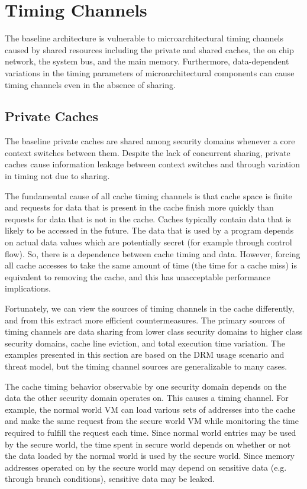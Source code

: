 \section{Timing Channels}
\label{sec:tc_sources}
The baseline architecture is vulnerable to microarchitectural timing channels 
caused by shared resources including the private and shared caches, the on chip 
network, the system bus, and the main memory. Furthermore, data-dependent 
variations in the timing parameters of microarchitectural components can cause 
timing channels even in the absence of sharing.

\subsection{Private Caches}
The baseline private caches are shared among security domains whenever a core 
context switches between them. Despite the lack of concurrent sharing, private 
caches cause information leakage between context switches and through variation 
in timing not due to sharing. 

The fundamental cause of all cache timing channels is that cache space is 
finite and requests for data that is present in the cache finish more quickly 
than requests for data that is not in the cache. Caches typically contain data 
that is likely to be accessed in the future. The data that is used by a program 
depends on actual data values which are potentially secret (for example through 
control flow). So, there is a dependence between cache timing and data.  
However, forcing all cache accesses to take the same amount of time (the time 
for a cache miss) is equivalent to removing the cache, and this has 
unacceptable performance implications.

Fortunately, we can view the sources of timing channels in the cache 
differently, and from this extract more efficient countermeasures. The primary 
sources of timing channels are data sharing from lower class security domains 
to higher class security domains, cache line eviction, and total execution time 
variation. The examples presented in this section are based on the DRM usage 
scenario and threat model, but the timing channel sources are generalizable to 
many cases.

The cache timing behavior observable by one security domain depends on the data 
the other security domain operates on. This causes a timing channel. For 
example, the normal world VM can load various sets of addresses into the cache 
and make the same request from the secure world VM while monitoring the time 
required to fulfill the request each time.  Since normal world entries may be 
used by the secure world, the time spent in secure world depends on whether or 
not the data loaded by the normal world is used by the secure world.
Since memory addresses operated on by the secure world may depend on sensitive 
data (e.g. through branch conditions), sensitive data may be leaked. 

